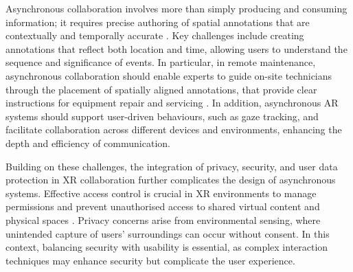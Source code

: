 Asynchronous collaboration involves more than simply producing and consuming information; it requires precise authoring of spatial annotations that are contextually and temporally accurate \cite{irlitti2016challenges}. Key challenges include creating annotations that reflect both location and time, allowing users to understand the sequence and significance of events. In particular, in remote maintenance, asynchronous collaboration should enable experts to guide on-site technicians through the placement of spatially aligned annotations, that provide clear instructions for equipment repair and servicing \cite{marques2021remote}. In addition, asynchronous AR systems should support user-driven behaviours, such as gaze tracking, and facilitate collaboration across different devices and environments, enhancing the depth and efficiency of communication.

Building on these challenges, the integration of privacy, security, and user data protection in XR collaboration further complicates the design of asynchronous systems. Effective access control is crucial in XR environments to manage permissions and prevent unauthorised access to shared virtual content and physical spaces \cite{rajaram2023eliciting}. Privacy concerns arise from environmental sensing, where unintended capture of users' surroundings can occur without consent. In this context, balancing security with usability is essential, as complex interaction techniques may enhance security but complicate the user experience.